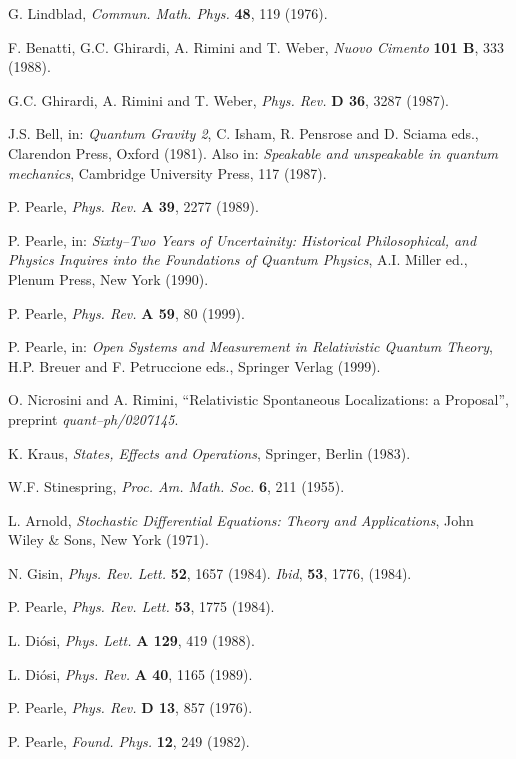 \documentclass[12pt]{article}
\begin{document}
\begin{thebibliography}{999}
 G. Lindblad, {\it Commun. Math. Phys.} {\bf 48}, 119
(1976).

 F. Benatti, G.C. Ghirardi, A. Rimini and T. Weber,
{\it Nuovo Cimento} {\bf 101 B}, 333 (1988).

 G.C. Ghirardi, A. Rimini and T. Weber, {\it Phys.
Rev.} {\bf D 36}, 3287 (1987).

 J.S. Bell, in: {\it Quantum Gravity 2}, C. Isham,
R. Pensrose and D. Sciama eds., Clarendon Press, Oxford (1981).
Also in: {\it Speakable and unspeakable in quantum mechanics},
Cambridge University Press, 117 (1987).

 P. Pearle, {\it Phys. Rev.} {\bf A 39}, 2277
(1989).

 P. Pearle, in: {\it Sixty--Two Years of Uncertainity:
Historical Philosophical, and Physics Inquires into the
Foundations of Quantum Physics}, A.I. Miller ed., Plenum Press,
New York (1990).

 P. Pearle, {\it Phys. Rev.} {\bf A 59}, 80 (1999).

 P. Pearle, in: {\it Open Systems and Measurement in
Relativistic Quantum Theory}, H.P. Breuer and F. Petruccione eds.,
Springer Verlag (1999).

 O. Nicrosini and A. Rimini, ``Relativistic
Spontaneous Localizations: a Proposal'', preprint {\it
quant--ph/0207145}.

 K. Kraus, {\it States, Effects and Operations},
Springer, Berlin (1983).

 W.F. Stinespring, {\it Proc. Am. Math. Soc.} {\bf
6}, 211 (1955).

 L. Arnold, {\it Stochastic Differential Equations:
Theory and Applications}, John Wiley \& Sons, New York (1971).

 N. Gisin, {\it Phys. Rev. Lett.} {\bf 52}, 1657
(1984). {\it Ibid}, {\bf 53}, 1776, (1984).

 P. Pearle, {\it Phys. Rev. Lett.} {\bf 53}, 1775
(1984).

 L. Di\'osi, {\it Phys. Lett.} {\bf A 129}, 419
(1988).

 L. Di\'osi, {\it Phys. Rev.} {\bf A 40}, 1165
(1989).

 P. Pearle, {\it Phys. Rev.} {\bf D 13}, 857 (1976).

 P. Pearle, {\it Found. Phys.} {\bf 12}, 249 (1982).


\end{thebibliography}
\end{document}
